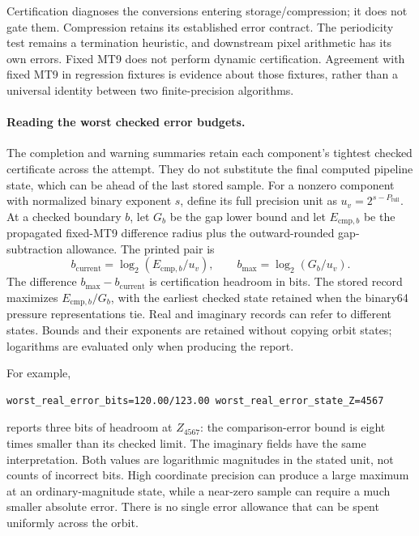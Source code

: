 Certification diagnoses the conversions entering storage/compression; it does
not gate them. Compression retains its established error contract. The periodicity
test remains a termination heuristic, and downstream pixel arithmetic has its
own errors. Fixed MT9 does not perform dynamic certification. Agreement with
fixed MT9 in regression fixtures is evidence about those fixtures, rather than
a universal identity between two finite-precision algorithms.

\paragraph{Reading the worst checked error budgets.}
The completion and warning summaries retain each component's tightest
checked certificate across the attempt. They do not substitute the final
computed pipeline state, which can be ahead of the last stored sample.
For a nonzero component with normalized binary exponent $s$, define its full
precision unit as $u_v=2^{s-P_{\mathrm{full}}}$. At a checked boundary $b$,
let $G_b$ be the gap lower bound and let $E_{\mathrm{cmp},b}$ be the propagated
fixed-MT9 difference radius plus the outward-rounded gap-subtraction allowance.
The printed pair is
\begin{equation}
 b_{\mathrm{current}}=\log_2(E_{\mathrm{cmp},b}/u_v),
 \qquad b_{\mathrm{max}}=\log_2(G_b/u_v).
 \label{eq:dynamic-diagnostic-budget}
\end{equation}
The difference $b_{\mathrm{max}}-b_{\mathrm{current}}$ is certification
headroom in bits. The stored record maximizes
$E_{\mathrm{cmp},b}/G_b$, with the earliest checked state retained when the
binary64 pressure representations tie. Real and imaginary records can refer
to different states. Bounds and their exponents are retained without copying
orbit states; logarithms are evaluated only when producing the report.

For example,
\begin{lstlisting}
worst_real_error_bits=120.00/123.00 worst_real_error_state_Z=4567
\end{lstlisting}
reports three bits of headroom at $Z_{4567}$: the comparison-error bound is
eight times smaller than its checked limit. The imaginary fields have the
same interpretation. Both values are logarithmic magnitudes in the stated
unit, not counts of incorrect bits. High coordinate precision can produce a
large maximum at an ordinary-magnitude state, while a near-zero sample can
require a much smaller absolute error. There is no single error allowance
that can be spent uniformly across the orbit.

